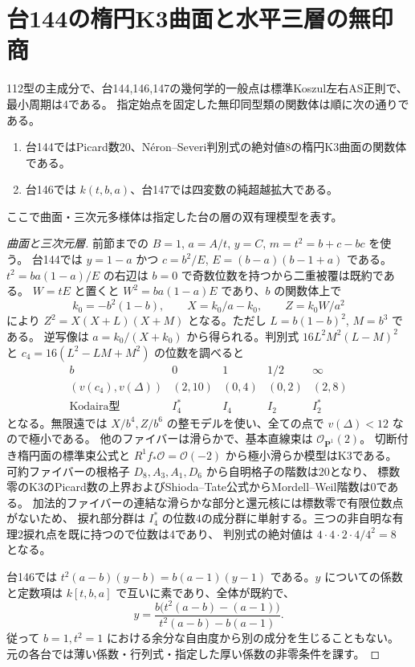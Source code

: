 \section{台144の楕円K3曲面と水平三層の無印商}
\label{sec:parallel-horizontal-moduli}
\begin{theorem}\label{thm:parallel-horizontal-moduli}
112型の主成分で、台144,146,147の幾何学的一般点は標準Koszul左右AS正則で、最小周期は4である。
指定始点を固定した無印同型類の関数体は順に次の通りである。
\begin{enumerate}
\item 台144ではPicard数20、Néron--Severi判別式の絶対値8の楕円K3曲面の関数体である。
\item 台146では $k(t,b,a)$、台147では四変数の純超越拡大である。
\end{enumerate}
ここで曲面・三次元多様体は指定した台の層の双有理模型を表す。
\end{theorem}

\begin{proof}[曲面と三次元層]
前節までの $B=1$, $a=A/t$, $y=C$, $m=t^2=b+c-bc$ を使う。
台144では $y=1-a$ かつ $c=b^2/E$, $E=(b-a)(b-1+a)$ である。
$t^2=b a(1-a)/E$ の右辺は $b=0$ で奇数位数を持つから二重被覆は既約である。
$W=tE$ と置くと $W^2=b a(1-a)E$ であり、$b$ の関数体上で
\[
 k_0=-b^2(1-b),\qquad X=k_0/a-k_0,\qquad Z=k_0 W/a^2
\]
により $Z^2=X(X+L)(X+M)$ となる。ただし $L=b(1-b)^2$, $M=b^3$ である。
逆写像は $a=k_0/(X+k_0)$ から得られる。判別式 $16L^2M^2(L-M)^2$ と
$c_4=16(L^2-LM+M^2)$ の位数を調べると
\[
\begin{array}{c|rrrr}
 b&0&1&1/2&\infty\\\hline
 (v(c_4),v(\Delta))&(2,10)&(0,4)&(0,2)&(2,8)\\
 \text{Kodaira型}&I_4^*&I_4&I_2&I_2^*
\end{array}
\]
となる。無限遠では $X/b^4,Z/b^6$ の整モデルを使い、全ての点で $v(\Delta)<12$ なので極小である。
他のファイバーは滑らかで、基本直線束は $\mathcal O_{\mathbf P^1}(2)$。
切断付き楕円面の標準束公式と $R^1f_*\mathcal O=\mathcal O(-2)$ から極小滑らか模型はK3である。
可約ファイバーの根格子 $D_8,A_3,A_1,D_6$ から自明格子の階数は20となり、
標数零のK3のPicard数の上界およびShioda--Tate公式からMordell--Weil階数は0である。
加法的ファイバーの連結な滑らかな部分と還元核には標数零で有限位数点がないため、
捩れ部分群は $I_4^*$ の位数4の成分群に単射する。三つの非自明な有理2捩れ点を既に持つので位数は4であり、
判別式の絶対値は $4\cdot4\cdot2\cdot4/4^2=8$ となる。

台146では $t^2(a-b)(y-b)=b(a-1)(y-1)$ である。$y$ についての係数と定数項は
$k[t,b,a]$ で互いに素であり、全体が既約で、
\[
 y=\frac{b\big(t^2(a-b)-(a-1)\big)}{t^2(a-b)-b(a-1)} .
\]
従って $b=1,t^2=1$ における余分な自由度から別の成分を生じることもない。
元の各台では薄い係数・行列式・指定した厚い係数の非零条件を課す。
\end{proof}

